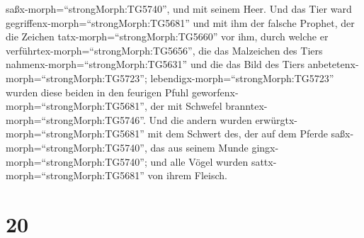 saßx-morph=``strongMorph:TG5740'', und mit seinem Heer. 
Und das Tier ward gegriffenx-morph=``strongMorph:TG5681'' und mit ihm
der falsche Prophet, der die Zeichen tatx-morph=``strongMorph:TG5660''
vor ihm, durch welche er verführtex-morph=``strongMorph:TG5656'', die
das Malzeichen des Tiers nahmenx-morph=``strongMorph:TG5631'' und die
das Bild des Tiers anbetetenx-morph=``strongMorph:TG5723'';
lebendigx-morph=``strongMorph:TG5723'' wurden diese beiden in den
feurigen Pfuhl geworfenx-morph=``strongMorph:TG5681'', der mit Schwefel
branntex-morph=``strongMorph:TG5746''.  Und die andern
wurden erwürgtx-morph=``strongMorph:TG5681'' mit dem Schwert des, der
auf dem Pferde saßx-morph=``strongMorph:TG5740'', das aus seinem Munde
gingx-morph=``strongMorph:TG5740''; und alle Vögel wurden
sattx-morph=``strongMorph:TG5681'' von ihrem Fleisch.

\hypertarget{section-19}{%
\section{20}\label{section-19}}

